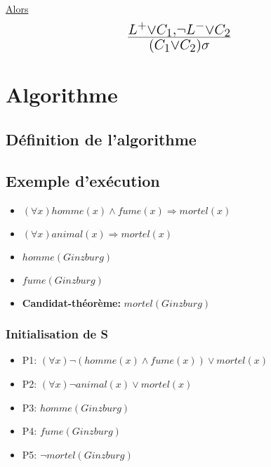 \underline{Alors} $$ \mbox{\huge $\frac{L^{+} \vee C_1, \neg L^{-} \vee C_2}{(C_1 \vee C_2)\sigma}$ } $$

\section{Algorithme}

\subsection{Définition de l'algorithme}
\begin{algorithm}
\end{algorithm}

\subsection{Exemple d'exécution}
\begin{itemize}
  \item $(\forall x) homme(x) \wedge fume(x) \Rightarrow mortel(x)$
  \item $(\forall x) animal(x) \Rightarrow mortel(x)$
  \item $homme(Ginzburg)$
  \item $fume(Ginzburg)$
  \item \textbf{Candidat-théorème:} $mortel(Ginzburg)$
\end{itemize}

\subsubsection{Initialisation de S}
\begin{itemize}
  \item P1: $(\forall x) \neg (homme(x)\wedge fume(x)) \vee mortel(x)$
  \item P2: $(\forall x) \neg animal(x) \vee mortel(x)$
  \item P3: $homme(Ginzburg)$
  \item P4: $fume(Ginzburg)$
  \item P5: $\neg mortel(Ginzburg)$
\end{itemize}

